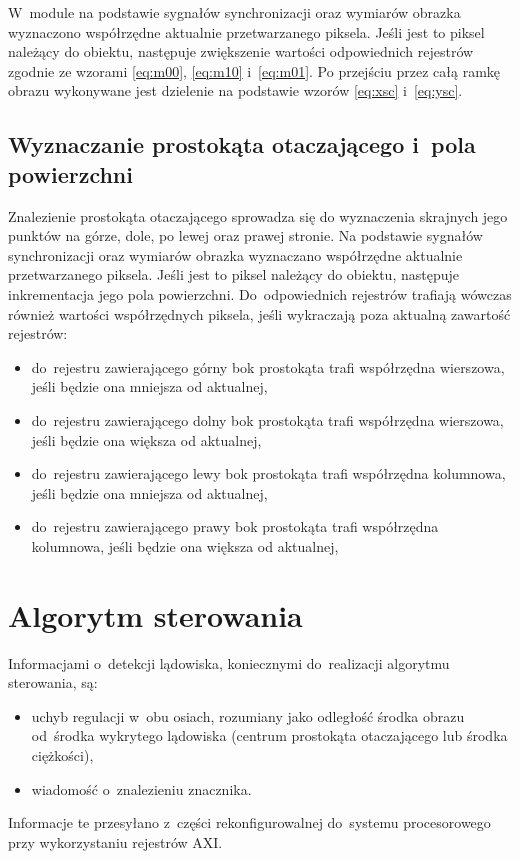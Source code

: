 W~module na podstawie sygnałów synchronizacji oraz wymiarów obrazka wyznaczono współrzędne aktualnie przetwarzanego piksela. 
Jeśli jest to piksel należący do obiektu, następuje zwiększenie wartości odpowiednich rejestrów zgodnie ze wzorami
\ref{eq:m00}, \ref{eq:m10} i~\ref{eq:m01}. 
Po przejściu przez całą ramkę obrazu wykonywane jest dzielenie na podstawie wzorów \ref{eq:xsc} i~\ref{eq:ysc}.

\subsection{Wyznaczanie prostokąta otaczającego i~pola powierzchni}
\label{subsec:prostokat_otaczajacy}

Znalezienie prostokąta otaczającego sprowadza się do wyznaczenia skrajnych jego punktów na górze, dole, po lewej oraz prawej stronie. 
Na podstawie sygnałów synchronizacji oraz wymiarów obrazka wyznaczano współrzędne aktualnie przetwarzanego piksela. 
Jeśli jest to piksel należący do obiektu, następuje inkrementacja jego pola powierzchni. 
Do~odpowiednich rejestrów trafiają wówczas również wartości współrzędnych piksela, jeśli wykraczają poza aktualną zawartość rejestrów:
\begin{itemize}
	\item do~rejestru zawierającego górny bok prostokąta trafi współrzędna wierszowa, jeśli będzie ona mniejsza od aktualnej,
	\item do~rejestru zawierającego dolny bok prostokąta trafi współrzędna wierszowa, jeśli będzie ona większa od aktualnej,
	\item do~rejestru zawierającego lewy bok prostokąta trafi współrzędna kolumnowa, jeśli będzie ona mniejsza od aktualnej,
	\item do~rejestru zawierającego prawy bok prostokąta trafi współrzędna kolumnowa, jeśli będzie ona większa od aktualnej,
\end{itemize}  


\section{Algorytm sterowania}
\label{sec:algorytm_sterowania}

Informacjami o~detekcji lądowiska, koniecznymi do~realizacji algorytmu sterowania, są:
\begin{itemize}
	\item uchyb regulacji w~obu osiach, rozumiany jako odległość środka obrazu od~środka wykrytego lądowiska (centrum prostokąta otaczającego lub środka ciężkości),
	\item wiadomość o~znalezieniu znacznika. %
\end{itemize}
Informacje te przesyłano z~części rekonfigurowalnej do~systemu procesorowego przy wykorzystaniu rejestrów AXI.

